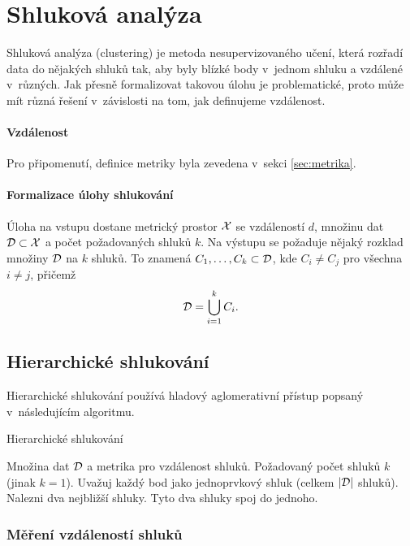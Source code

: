 \section{Shluková analýza}

Shluková analýza (clustering) je metoda nesupervizovaného učení, která rozřadí data do nějakých shluků tak, aby byly blízké body v~jednom shluku a vzdálené v~různých. Jak přesně formalizovat takovou úlohu je problematické, proto může mít různá řešení v~závislosti na tom, jak definujeme vzdálenost.

\paragraph{Vzdálenost} Pro připomenutí, definice metriky byla zevedena v~sekci \ref{sec:metrika}.

\paragraph{Formalizace úlohy shlukování} Úloha na vstupu dostane metrický prostor $\mathcal{X}$ se vzdáleností $d$, množinu dat $\mathcal{D} \subset \mathcal{X}$ a počet požadovaných shluků $k$. Na výstupu se požaduje nějaký rozklad množiny $\mathcal{D}$ na $k$ shluků. To znamená $C_1, \ldots, C_k \subset \mathcal{D}$, kde $C_i \neq C_j$ pro všechna $i \neq j$, přičemž \[\mathcal{D} = \bigcup_{i=1}^{k} C_i.\]

\subsection{Hierarchické shlukování}

Hierarchické shlukování používá hladový aglomerativní přístup popsaný v~následujícím algoritmu.

\begin{algorithm}[H]
    \renewcommand{\thealgorithm}{}
    \caption{Hierarchické shlukování}
    \begin{algorithmic}[1]
        \Require
        \Statex Množina dat $\mathcal{D}$ a metrika pro vzdálenost shluků.
        \Statex Požadovaný počet shluků $k$ (jinak $k=1$).
        \Statex
        \State Uvažuj každý bod jako jednoprvkový shluk (celkem $|\mathcal{D}|$ shluků).
        \State Nalezni dva nejbližší shluky.
        \State Tyto dva shluky spoj do jednoho.
        \EndWhile
    \end{algorithmic}
\end{algorithm}

\subsubsection{Měření vzdáleností shluků}

